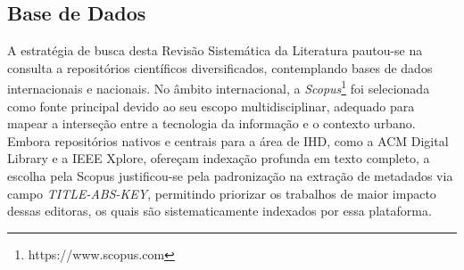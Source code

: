 \documentclass[
	12pt,				%
	oneside,			%
	a4paper,			%
	english,			%
	brazil				%
	]{abntex2ppgsi}
\begin{document}



\subsection{Base de Dados}

    A estratégia de busca desta Revisão Sistemática da Literatura pautou-se na consulta a repositórios científicos diversificados, contemplando bases de dados internacionais e nacionais. No âmbito internacional, a \emph{Scopus}\footnote{https://www.scopus.com} foi selecionada como fonte principal devido ao seu escopo multidisciplinar, adequado para mapear a interseção entre a tecnologia da informação e o contexto urbano. Embora repositórios nativos e centrais para a área de IHD, como a ACM Digital Library e a IEEE Xplore, ofereçam indexação profunda em texto completo, a escolha pela Scopus justificou-se pela padronização na extração de metadados via campo \textit{TITLE-ABS-KEY}, permitindo priorizar os trabalhos de maior impacto dessas editoras, os quais são sistematicamente indexados por essa plataforma.
\end{document}
